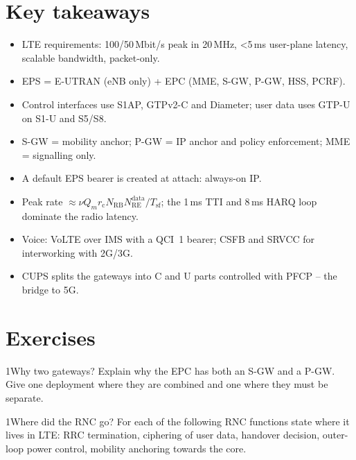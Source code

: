 \documentclass[11pt,a4paper]{article}
\begin{document}
\section{Key takeaways}
\begin{takeawaybox}
\begin{itemize}
  \item LTE requirements: 100/50\,Mbit/s peak in 20\,MHz, <5\,ms user-plane latency, scalable
        bandwidth, packet-only.
  \item EPS = E-UTRAN (eNB only) + EPC (MME, S-GW, P-GW, HSS, PCRF).
  \item Control interfaces use S1AP, GTPv2-C and Diameter; user data uses GTP-U on S1-U and S5/S8.
  \item S-GW = mobility anchor; P-GW = IP anchor and policy enforcement; MME = signalling only.
  \item A default EPS bearer is created at attach: always-on IP.
  \item Peak rate $\approx\nu Q_m r_\mathrm{c} N_{\mathrm{RB}} N_{\mathrm{RE}}^{\mathrm{data}}/T_{\mathrm{sf}}$;
        the 1\,ms TTI and 8\,ms HARQ loop dominate the radio latency.
  \item Voice: VoLTE over IMS with a QCI~1 bearer; CSFB and SRVCC for interworking with 2G/3G.
  \item CUPS splits the gateways into C and U parts controlled with PFCP -- the bridge to 5G.
\end{itemize}
\end{takeawaybox}

\section{Exercises}

\begin{exercisebox}{1}{Why two gateways?}\label{exr:twogw}
Explain why the EPC has both an S-GW and a P-GW. Give one deployment where they are combined and
one where they must be separate.
\end{exercisebox}

\begin{exercisebox}{1}{Where did the RNC go?}\label{exr:rnc}
For each of the following RNC functions state where it lives in LTE: RRC termination, ciphering of
user data, handover decision, outer-loop power control, mobility anchoring towards the core.
\end{exercisebox}
\end{document}
